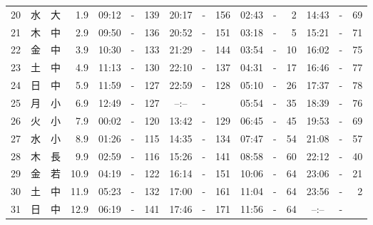 \documentclass[12pt.a4j]{jsarticle}
\begin{document}
\begin{center}
\begin{table}[ht]
\begin{tabular}{|rc|cr|ccrccr|ccrccr|}
20 & 水 & 大 &  1.9 &  09:12 &-& 139  &  20:17 &-& 156  &   02:43 &-&   2  &   14:43 &-&  69  \\
21 & 木 & 中 &  2.9 &  09:50 &-& 136  &  20:52 &-& 151  &   03:18 &-&   5  &   15:21 &-&  71  \\
22 & 金 & 中 &  3.9 &  10:30 &-& 133  &  21:29 &-& 144  &   03:54 &-&  10  &   16:02 &-&  75  \\
23 & 土 & 中 &  4.9 &  11:13 &-& 130  &  22:10 &-& 137  &   04:31 &-&  17  &   16:46 &-&  77  \\
24 & 日 & 中 &  5.9 &  11:59 &-& 127  &  22:59 &-& 128  &   05:10 &-&  26  &   17:37 &-&  78  \\
25 & 月 & 小 &  6.9 &  12:49 &-& 127  &  --:-- &-&     &   05:54 &-&  35  &   18:39 &-&  76  \\
26 & 火 & 小 &  7.9 &  00:02 &-& 120  &  13:42 &-& 129  &   06:45 &-&  45  &   19:53 &-&  69  \\
27 & 水 & 小 &  8.9 &  01:26 &-& 115  &  14:35 &-& 134  &   07:47 &-&  54  &   21:08 &-&  57  \\
28 & 木 & 長 &  9.9 &  02:59 &-& 116  &  15:26 &-& 141  &   08:58 &-&  60  &   22:12 &-&  40  \\
29 & 金 & 若 & 10.9 &  04:19 &-& 122  &  16:14 &-& 151  &   10:06 &-&  64  &   23:06 &-&  21  \\
30 & 土 & 中 & 11.9 &  05:23 &-& 132  &  17:00 &-& 161  &   11:04 &-&  64  &   23:56 &-&   2  \\
31 & 日 & 中 & 12.9 &  06:19 &-& 141  &  17:46 &-& 171  &   11:56 &-&  64  &   --:-- &-&     \\
   \hline
   \end{tabular}
\end{table}
\newpage
\end{center}
\end{document}
